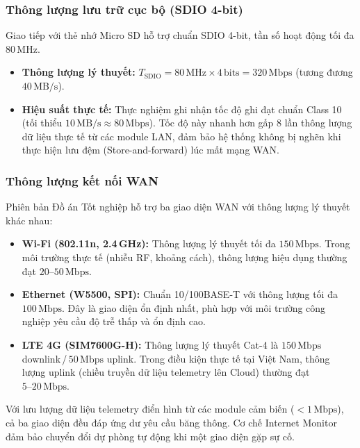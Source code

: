 \subsubsection{Thông lượng lưu trữ cục bộ (SDIO 4-bit)}
Giao tiếp với thẻ nhớ Micro SD hỗ trợ chuẩn SDIO 4-bit, tần số hoạt động tối đa $80 \, \text{MHz}$.
\begin{itemize}
    \item \textbf{Thông lượng lý thuyết:} $T_{\text{SDIO}} = 80 \, \text{MHz} \times 4 \, \text{bits} = 320 \, \text{Mbps}$ (tương đương $40 \, \text{MB/s}$).
    \item \textbf{Hiệu suất thực tế:} Thực nghiệm ghi nhận tốc độ ghi đạt chuẩn Class 10 (tối thiểu $10 \, \text{MB/s} \approx 80 \, \text{Mbps}$). Tốc độ này nhanh hơn gấp 8 lần thông lượng dữ liệu thực tế từ các module LAN, đảm bảo hệ thống không bị nghẽn khi thực hiện lưu đệm (Store-and-forward) lúc mất mạng WAN.
\end{itemize}
\subsubsection{Thông lượng kết nối WAN}
Phiên bản Đồ án Tốt nghiệp hỗ trợ ba giao diện WAN với thông lượng lý thuyết khác nhau:
\begin{itemize}
    \item \textbf{Wi-Fi (802.11n, 2.4\,GHz):} Thông lượng lý thuyết tối đa $150 \, \text{Mbps}$. Trong môi trường thực tế (nhiễu RF, khoảng cách), thông lượng hiệu dụng thường đạt $20\text{--}50 \, \text{Mbps}$.
    \item \textbf{Ethernet (W5500, SPI):} Chuẩn 10/100BASE-T với thông lượng tối đa $100 \, \text{Mbps}$. Đây là giao diện ổn định nhất, phù hợp với môi trường công nghiệp yêu cầu độ trễ thấp và ổn định cao.
    \item \textbf{LTE 4G (SIM7600G-H):} Thông lượng lý thuyết Cat-4 là $150 \, \text{Mbps}$ downlink\,/\,$50 \, \text{Mbps}$ uplink. Trong điều kiện thực tế tại Việt Nam, thông lượng uplink (chiều truyền dữ liệu telemetry lên Cloud) thường đạt $5\text{--}20 \, \text{Mbps}$.
\end{itemize}
Với lưu lượng dữ liệu telemetry điển hình từ các module cảm biến ($< 1 \, \text{Mbps}$), cả ba giao diện đều đáp ứng dư yêu cầu băng thông. Cơ chế Internet Monitor đảm bảo chuyển đổi dự phòng tự động khi một giao diện gặp sự cố.
